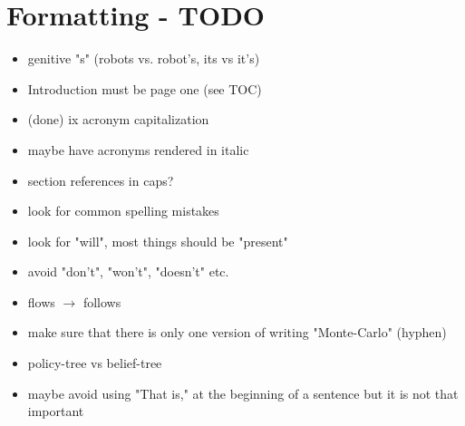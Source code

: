 \chapter{Formatting - TODO}

\begin{itemize}
  \item genitive "s" (robots vs. robot's, its vs it's) 
  \item Introduction must be page one (see TOC)
  \item (done) ix acronym capitalization
  \item maybe have acronyms rendered in italic
  \item section references in caps?
  \item look for common spelling mistakes
  \item look for "will", most things should be "present"
  \item avoid "don't", "won't", "doesn't" etc.\
  \item flows $\to$ follows
  \item make sure that there is only one version of writing "Monte-Carlo" (hyphen)
  \item policy-tree vs belief-tree
  \item maybe avoid using "That is," at the beginning of a sentence but it is not that important
\end{itemize}
